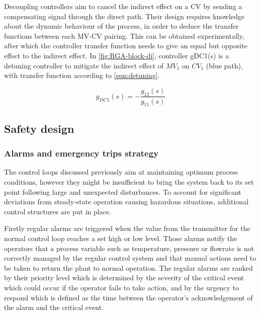 Decoupling controllers aim to cancel the indirect effect on a CV by sending a compensating signal through the direct path. Their design requires knowledge about the dynamic behaviour of the process, in order to deduce the transfer functions between each MV-CV pairing. This can be obtained experimentally, after which the controller transfer function needs to give an equal but opposite effect to the indirect effect. In \cref{fig:RGA-block-di}, controller gDC1(s) is a detuning controller to mitigate the indirect effect of $MV_1$ on $CV_1$ (blue path), with transfer function according to \cref{eqn:detuning}.

\begin{equation}
\label{eqn:detuning}
g_{DC1}(s)=-\frac{g_{12}(s)}{g_{11}(s)}
\end{equation}

\subsection{Safety design} %

\subsubsection{Alarms and emergency trips strategy}
The control loops discussed previously aim at maintaining optimum process conditions, however they might be insufficient to bring the system back to its set point following large and unexpected disturbances. To account for significant deviations from steady-state operation causing hazardous situations, additional control structures are put in place.  

Firstly regular alarms are triggered when the value from the transmitter for the normal control loop reaches a set high or low level. Those alarms notify the operators that a process variable such as temperature, pressure or flowrate is not correctly managed by the regular control system and that manual actions need to be taken to return the plant to normal operation. The regular alarms are ranked by their priority level which is determined by the severity of the critical event which could occur if the operator fails to take action, and by the urgency to respond which is defined as the time between the operator's acknowledgement of the alarm and the critical event. 

